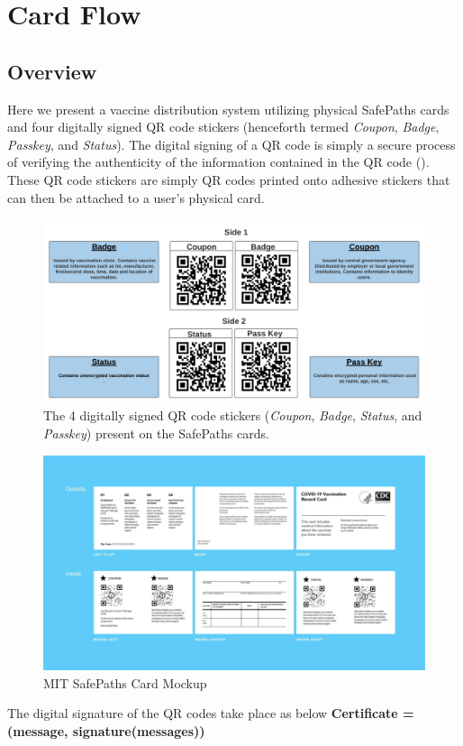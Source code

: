 \section{Card Flow}
\subsection{Overview}
Here we present a vaccine distribution system utilizing physical SafePaths cards and four digitally signed QR code stickers (henceforth termed \textit{Coupon}, \textit{Badge}, \textit{Passkey}, and \textit{Status}). The digital signing of a QR code is simply a secure process of verifying the authenticity of the information contained in the QR code (\cite{crypt}). These QR code stickers are simply QR codes printed onto adhesive stickers that can then be attached to a user’s physical card. 

\begin{figure}[ht!]
\begin{center}
\includegraphics[width=12cm]{images/safepaths_card.pdf}
\end{center}
\caption{The 4 digitally signed QR code stickers (\textit{Coupon}, \textit{Badge}, \textit{Status}, and \textit{Passkey}) present on the SafePaths cards.}
\label{qr-codes}
\end{figure}



\begin{figure}[ht!]
\begin{center}
\includegraphics[width=13.5cm]{images/mockup.png}
\end{center}
\caption{MIT SafePaths Card Mockup}
\label{mockup}
\end{figure}
The digital signature of the QR codes take place as below
\textbf{Certificate = (message, signature(messages))}

